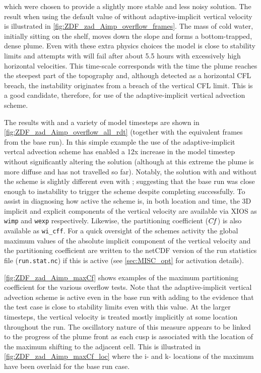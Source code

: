 \documentclass[../main/NEMO_manual]{subfiles}
\newcommand{\cf}{\ensuremath{C\kern-0.14em f}}
\begin{document}
\noindent which were chosen to provide a slightly more stable and less noisy solution. The
result when using the default value of  without adaptive-implicit
vertical velocity is illustrated in \autoref{fig:ZDF_zad_Aimp_overflow_frames}. The mass of
cold water, initially sitting on the shelf, moves down the slope and forms a
bottom-trapped, dense plume. Even with these extra physics choices the model is close to
stability limits and attempts with  will fail after about 5.5 hours
with excessively high horizontal velocities. This time-scale corresponds with the time the
plume reaches the steepest part of the topography and, although detected as a horizontal
CFL breach, the instability originates from a breach of the vertical CFL limit. This is a good
candidate, therefore, for use of the adaptive-implicit vertical advection scheme.

The results with  and a variety of model timesteps
are shown in \autoref{fig:ZDF_zad_Aimp_overflow_all_rdt} (together with the equivalent
frames from the base run).  In this simple example the use of the adaptive-implicit
vertcal advection scheme has enabled a 12x increase in the model timestep without
significantly altering the solution (although at this extreme the plume is more diffuse
and has not travelled so far).  Notably, the solution with and without the scheme is
slightly different even with ; suggesting that the base run was
close enough to instability to trigger the scheme despite completing successfully.
To assist in diagnosing how active the scheme is, in both location and time, the 3D
implicit and explicit components of the vertical velocity are available via XIOS as
\texttt{wimp} and \texttt{wexp} respectively.  Likewise, the partitioning coefficient
(\cf) is also available as \texttt{wi\_cff}. For a quick oversight of
the schemes activity the global maximum values of the absolute implicit component
of the vertical velocity and the partitioning coefficient are written to the netCDF
version of the run statistics file (\texttt{run.stat.nc}) if this is active (see
\autoref{sec:MISC_opt} for activation details).

\autoref{fig:ZDF_zad_Aimp_maxCf} shows examples of the maximum partitioning coefficient for
the various overflow tests.  Note that the adaptive-implicit vertical advection scheme is
active even in the base run with  adding to the evidence that the
test case is close to stability limits even with this value. At the larger timesteps, the
vertical velocity is treated mostly implicitly at some location throughout the run. The
oscillatory nature of this measure appears to be linked to the progress of the plume front
as each cusp is associated with the location of the maximum shifting to the adjacent cell.
This is illustrated in \autoref{fig:ZDF_zad_Aimp_maxCf_loc} where the i- and k- locations of the
maximum have been overlaid for the base run case.
\end{document}
